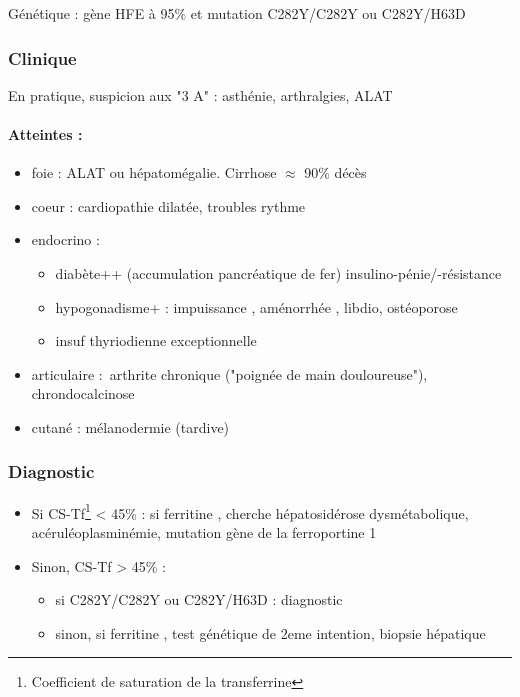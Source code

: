 \documentclass[11pt]{article}
\begin{document}
Génétique : gène HFE à 95\% et mutation C282Y/C282Y ou C282Y/H63D

\subsubsection{Clinique}
\label{sec:orga6b87bb}
En pratique, suspicion aux "3 A" : asthénie, arthralgies, \inc ALAT

\paragraph{Atteintes :}
\label{sec:org8dfa2c0}
\begin{itemize}
\item foie : \inc ALAT ou hépatomégalie. Cirrhose \(\approx\) 90\% décès
\item coeur : cardiopathie dilatée, troubles rythme
\item endocrino :
\begin{itemize}
\item diabète++ (accumulation pancréatique de fer) insulino-pénie/-résistance
\item hypogonadisme+ : impuissance \male, aménorrhée \female, \dec libdio,
ostéoporose
\item insuf thyriodienne exceptionnelle
\end{itemize}
\item articulaire : arthrite chronique ("poignée de main douloureuse"), chrondocalcinose
\item cutané : mélanodermie (tardive)
\end{itemize}


\subsubsection{Diagnostic}
\label{sec:org37b6e3e}
\begin{itemize}
\item Si CS-Tf\footnote{Coefficient de saturation de la transferrine} < 45\% : si ferritine \inc, cherche hépatosidérose dysmétabolique,
acéruléoplasminémie, mutation gène de la ferroportine 1
\item Sinon, CS-Tf > 45\% : 
\begin{itemize}
\item si C282Y/C282Y ou C282Y/H63D : diagnostic
\item sinon, si ferritine \inc, test génétique de 2eme intention, biopsie
hépatique
\end{itemize}
\end{itemize}
\end{document}
